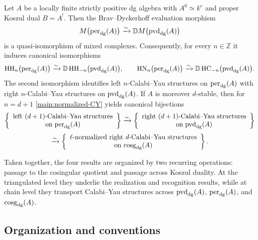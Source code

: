 \documentclass[11pt,a4paper,dvipsnames,x11names]{amsart}
\begin{document}
\begin{mainthm}\label{main:left-right-CY}
Let $A$ be a locally finite strictly positive dg algebra with $A^0\simeq k^r$ and proper Koszul dual $B=A^!$. Then the Brav--Dyckerhoff evaluation morphism
\[
M\bigl(\operatorname{per}_{\mathrm{dg}}(A)\bigr)\xrightarrow{\sim}\mathbb D M\bigl(\operatorname{pvd}_{\mathrm{dg}}(A)\bigr)
\]
is a quasi-isomorphism of mixed complexes. Consequently, for every $n\in\mathbb Z$ it induces canonical isomorphisms
\[
\operatorname{HH}_n\bigl(\operatorname{per}_{\mathrm{dg}}(A)\bigr)\xrightarrow{\sim}\mathbb D\operatorname{HH}_{-n}\bigl(\operatorname{pvd}_{\mathrm{dg}}(A)\bigr),
\qquad
\operatorname{HN}_n\bigl(\operatorname{per}_{\mathrm{dg}}(A)\bigr)\xrightarrow{\sim}\mathbb D\operatorname{HC}_{-n}\bigl(\operatorname{pvd}_{\mathrm{dg}}(A)\bigr).
\]
The second isomorphism identifies left $n$-Calabi--Yau structures on $\operatorname{per}_{\mathrm{dg}}(A)$ with right $n$-Calabi--Yau structures on $\operatorname{pvd}_{\mathrm{dg}}(A)$. If $A$ is moreover $d$-stable, then for $n=d+1$ \cref{main:normalized-CY} yields canonical bijections
\[
\begin{gathered}
\left\{\begin{array}{c}\text{left $(d+1)$-Calabi--Yau structures}\\ \text{on $\operatorname{per}_{\mathrm{dg}}(A)$}\end{array}\right\}
\xrightarrow{\sim}
\left\{\begin{array}{c}\text{right $(d+1)$-Calabi--Yau structures}\\ \text{on $\operatorname{pvd}_{\mathrm{dg}}(A)$}\end{array}\right\}\\[1mm]
\xrightarrow{\sim}
\left\{\begin{array}{c}\text{$\ell$-normalized right $d$-Calabi--Yau structures}\\ \text{on $\operatorname{cosg}_{\mathrm{dg}}(A)$}\end{array}\right\}.
\end{gathered}
\]
\end{mainthm}

Taken together, the four results are organized by two recurring operations: passage to the cosingular quotient and passage across Koszul duality. At the triangulated level they underlie the realization and recognition results, while at chain level they transport Calabi--Yau structures across $\operatorname{pvd}_{\mathrm{dg}}(A)$, $\operatorname{per}_{\mathrm{dg}}(A)$, and $\operatorname{cosg}_{\mathrm{dg}}(A)$.

\subsection*{Organization and conventions}
\end{document}
